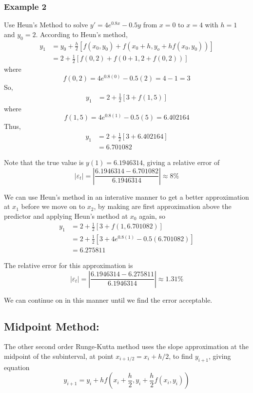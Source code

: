 \documentclass [titlepage,12pt,letter] {article}
\begin{document}
\subsubsection{Example 2}Use Heun's Method to solve $y'=4e^{0.8x}-0.5y$ from $x=0$ to $x=4$ with $h=1$ and $y_0=2$. According to Heun's method,
\begin{align*}
y_1&=y_0+\frac{h}{2}\left[f(x_0,y_0)+f(x_0+h,y_o+hf(x_0,y_0))\right] \\
&=2+\frac{1}{2}\left[f(0,2)+f(0+1,2+f(0,2))\right]
\end{align*}
where
\[
f(0,2)=4e^{0.8(0)}-0.5(2)=4-1=3
\]
So,
\begin{align*}
y_1&=2+\frac{1}{2}\left[3+f(1,5)\right]
\end{align*}
where
\[
f(1,5)=4e^{0.8(1)}-0.5(5)=6.402164
\]
Thus,
\begin{align*}
y_1&=2+\frac{1}{2}\left[3+6.402164\right] \\
&=6.701082
\end{align*}

Note that the true value is $y(1)=6.1946314$, giving a relative error of
\[
|\varepsilon_t|=\left|\frac{6.1946314-6.701082}{6.1946314}\right|\approx 8\%
\]

We can use Heun's method in an interative manner to get a better approximation at $x_1$ before we move on to $x_2$, by making are first approximation above the predictor and applying Heun's method at $x_0$ again, so
\begin{align*}
y_1&=2+\frac{1}{2}\left[3+f(1,6.701082)\right] \\
&=2+\frac{1}{2}\left[3+4e^{0.8(1)}-0.5(6.701082)\right] \\
&=6.275811
\end{align*}

The relative error for this approximation is
\[
|\varepsilon_t|=\left|\frac{6.1946314-6.275811}{6.1946314}\right|\approx 1.31\%
\]

We can continue on in this manner until we find the error acceptable.

\subsection{Midpoint Method:} The other second order Runge-Kutta method uses the slope approximation at the midpoint of the subinterval, at point $x_{i+1/2}=x_i+h/2$, to find $y_{i+1}$, giving equation
\[
y_{i+1}=y_i+hf\left(x_i+\frac{h}{2},y_i+\frac{h}{2}f(x_i,y_i)\right)
\]
\end{document}
